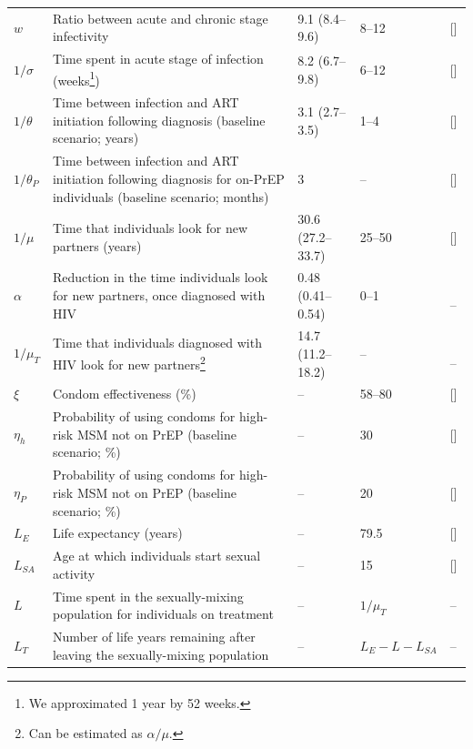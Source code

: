 \documentclass[12pt]{article}
\begin{document}
\begin{table}[H]
\begin{minipage}{\textwidth}
\begin{tabular}{l>{\raggedright}p{7.5cm}l>{\raggedright}p{2cm}l}
 	$w$ 			& Ratio between acute and chronic stage infectivity 	& 9.1 (8.4--9.6) & 8--12 & [\citenum{Patel2014}]\\ 
	$1/\sigma$ 	& Time spent in acute stage of infection (weeks\footnote{We approximated 1 year by 52 weeks.}) & 8.2 (6.7--9.8) & 6--12 & [\citenum{Lodi2011}]\\ 
	$1/\theta$		& Time between infection and {ART initiation following diagnosis} (baseline scenario; years)	& 3.1 (2.7--3.5) & 1--4 & [\citenum{Marty2019, Dabis_IAS2019}]\\
	$1/\theta_P$	& Time between infection {and ART initiation following diagnosis} for on-PrEP individuals (baseline scenario; months)	& 3 & -- & [\citenum{CNSANRS2015}]\\
	$1/\mu$ 		& {Time that individuals look for new partners (years)} & 30.6 (27.2--33.7) & 25--50 & [\citenum{Velter2015}]\\
	$\alpha$ 		& {Reduction in the time individuals look for new partners, once diagnosed with HIV} & 0.48 (0.41--0.54) & 0--1 & \,\, -- \\
	$1/ \mu_T$ 	& {Time that individuals diagnosed with HIV look for new partners}\footnote{Can be estimated as $\alpha/\mu$.} & 14.7 (11.2--18.2) & -- & \,\, -- \\ \midrule
	$\xi$			& Condom effectiveness (\%) & -- & 58--80 &[\citenum{Smith2015}]\\
	$\eta_h$		& Probability of using condoms for high-risk MSM not on PrEP (baseline scenario; \%) & -- & 30 & [\citenum{Molina2015}]\\
	$\eta_P$		& Probability of using condoms for high-risk MSM not on PrEP	(baseline scenario; \%) & -- & 20 & [\citenum{Molina2018}]\\ \midrule
	$L_E$		& Life expectancy (years) 	& -- & 79.5 & [\citenum{WHO_ART2016,INED_EspVieFrance}]\\
	$L_{SA}$	 	& Age at which individuals start sexual activity & -- & 15 & [\citenum{Velter2015}]\\
	$L$ 			& Time spent in the sexually-mixing population for individuals on treatment & -- & $1/ \mu_T$ & --\\
	$L_T$ 		& Number of life years remaining after leaving the sexually-mixing population & -- & $L_E - L - L_{SA}$ & --\\
	\bottomrule
	\end{tabular}
	\label{tab:Params}
\end{minipage}
\end{table}
\end{document}
